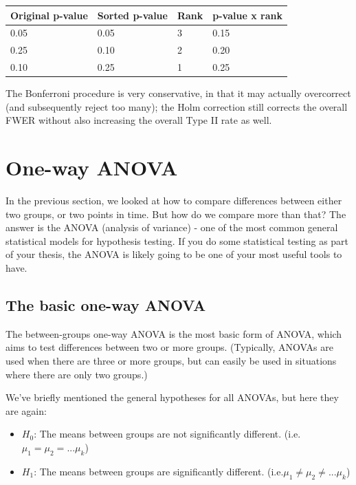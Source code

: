 \documentclass[
]{book}
\providecommand{\tightlist}{%
  \setlength{\itemsep}{0pt}\setlength{\parskip}{0pt}}
\begin{document}
\begin{tabular}{l|l|l|l}
\hline
Original p-value & Sorted p-value & Rank & p-value x rank\\
\hline
0.05 & 0.05 & 3 & 0.15\\
\hline
0.25 & 0.10 & 2 & 0.20\\
\hline
0.10 & 0.25 & 1 & 0.25\\
\hline
\end{tabular}

The Bonferroni procedure is very conservative, in that it may actually
overcorrect (and subsequently reject too many); the Holm correction
still corrects the overall FWER without also increasing the overall Type
II rate as well.

\section{One-way ANOVA}\label{one-way-anova}

In the previous section, we looked at how to compare differences between
either two groups, or two points in time. But how do we compare more
than that? The answer is the ANOVA (analysis of variance) - one of the
most common general statistical models for hypothesis testing. If you do
some statistical testing as part of your thesis, the ANOVA is likely
going to be one of your most useful tools to have.

\subsection{The basic one-way ANOVA}\label{the-basic-one-way-anova}

The between-groups one-way ANOVA is the most basic form of ANOVA, which
aims to test differences between two or more groups. (Typically, ANOVAs
are used when there are three or more groups, but can easily be used in
situations where there are only two groups.)

We've briefly mentioned the general hypotheses for all ANOVAs, but here
they are again:

\begin{itemize}
\tightlist
\item
  \(H_0\): The means between groups are not significantly different.
  (i.e.~\(\mu_1 = \mu_2 = ... \mu_k\))
\item
  \(H_1\): The means between groups are significantly different.
  (i.e.\(\mu_1 \neq \mu_2 \neq ... \mu_k\))
\end{itemize}
\end{document}
